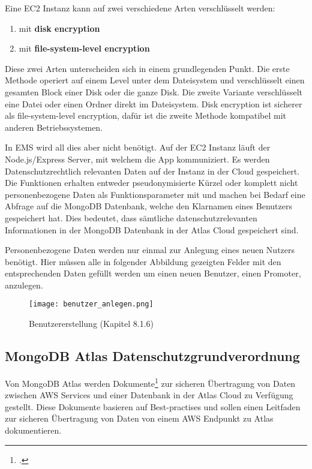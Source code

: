 Eine EC2 Instanz kann auf zwei verschiedene Arten verschlüsselt werden:
\begin{enumerate}
	\item mit \textbf{disk encryption}
	\item mit \textbf{file-system-level encryption}
\end{enumerate}
Diese zwei Arten unterscheiden sich in einem grundlegenden Punkt. Die erste Methode operiert auf einem Level unter dem Dateisystem und verschlüsselt einen gesamten Block einer Disk oder die ganze Disk. Die zweite Variante
verschlüsselt eine Datei oder einen Ordner direkt im Dateisystem. Disk encryption ist sicherer als file-system-level encryption, dafür ist die zweite Methode kompatibel mit anderen Betriebssystemen.

In EMS wird all dies aber nicht benötigt. Auf der EC2 Instanz läuft der Node.js/Express Server, mit welchem die App kommuniziert. Es werden Datenschutzrechtlich
relevanten Daten auf der Instanz in der Cloud gespeichert.
Die Funktionen erhalten entweder pseudonymisierte Kürzel oder komplett nicht personenbezogene Daten als Funktionsparameter mit und machen bei Bedarf eine Abfrage auf die MongoDB Datenbank,
welche den Klarnamen eines Benutzers gespeichert hat. Dies bedeutet, dass sämtliche datenschutzrelevanten Informationen in der MongoDB Datenbank in der Atlas Cloud gespeichert sind.

Personenbezogene Daten werden nur einmal zur Anlegung eines neuen Nutzers benötigt.
Hier müssen alle in folgender Abbildung gezeigten Felder mit den entsprechenden Daten gefüllt werden um einen neuen Benutzer, einen Promoter, anzulegen.
\begin{center}
	\begin{figure}[h]
		\centering
		\texttt{[image: benutzer\_anlegen.png]}
		\caption{Benutzererstellung (Kapitel 8.1.6)}
	\end{figure}
\end{center}

\subsection{MongoDB Atlas Datenschutzgrundverordnung}
Von MongoDB Atlas werden Dokumente\footcite{atlas-doku-aws} zur sicheren Übertragung von Daten zwischen AWS Services und einer Datenbank in der Atlas Cloud zu Verfügung gestellt. Diese Dokumente basieren auf Best-practises und sollen einen Leitfaden zur
sicheren Übertragung von Daten von einem AWS Endpunkt zu Atlas dokumentieren.

